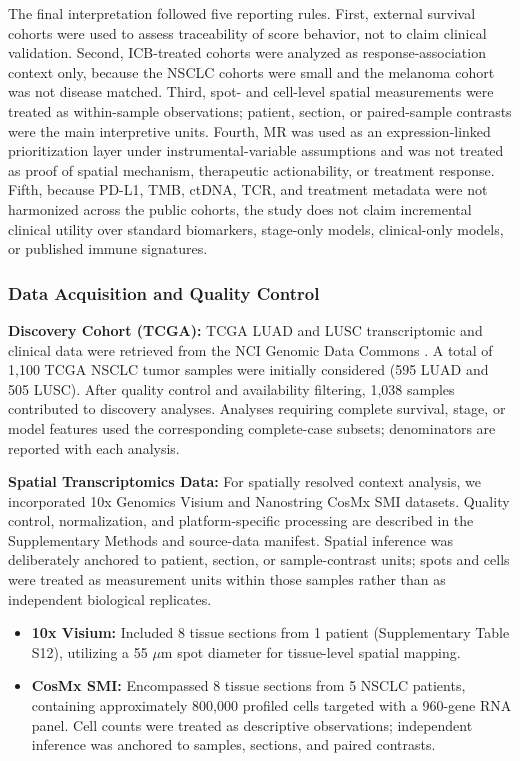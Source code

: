 \documentclass[pdflatex,sn-mathphys-num,referee,lineno]{sn-jnl}
\theoremstyle{thmstyleone}%
\theoremstyle{thmstyletwo}%
\theoremstyle{thmstylethree}%
\begin{document}
The final interpretation followed five reporting rules. First, external survival cohorts were used to assess traceability of score behavior, not to claim clinical validation. Second, ICB-treated cohorts were analyzed as response-association context only, because the NSCLC cohorts were small and the melanoma cohort was not disease matched. Third, spot- and cell-level spatial measurements were treated as within-sample observations; patient, section, or paired-sample contrasts were the main interpretive units. Fourth, MR was used as an expression-linked prioritization layer under instrumental-variable assumptions and was not treated as proof of spatial mechanism, therapeutic actionability, or treatment response. Fifth, because PD-L1, TMB, ctDNA, TCR, and treatment metadata were not harmonized across the public cohorts, the study does not claim incremental clinical utility over standard biomarkers, stage-only models, clinical-only models, or published immune signatures.

\subsubsection{Data Acquisition and Quality Control}

\textbf{Discovery Cohort (TCGA):} TCGA LUAD and LUSC transcriptomic and clinical data were retrieved from the NCI Genomic Data Commons \cite{hoadleyCelloforiginPatternsDominate2018a, thecancergenomeatlasresearchnetworkComprehensiveMolecularProfiling2014a}. A total of 1,100 TCGA NSCLC tumor samples were initially considered (595 LUAD and 505 LUSC). After quality control and availability filtering, 1,038 samples contributed to discovery analyses. Analyses requiring complete survival, stage, or model features used the corresponding complete-case subsets; denominators are reported with each analysis.

\textbf{Spatial Transcriptomics Data:} For spatially resolved context analysis, we incorporated 10x Genomics Visium and Nanostring CosMx SMI datasets. Quality control, normalization, and platform-specific processing are described in the Supplementary Methods and source-data manifest. Spatial inference was deliberately anchored to patient, section, or sample-contrast units; spots and cells were treated as measurement units within those samples rather than as independent biological replicates.
\begin{itemize}
    \item \textbf{10x Visium:} Included 8 tissue sections from 1 patient (Supplementary Table S12), utilizing a 55 $\mu$m spot diameter for tissue-level spatial mapping.
    \item \textbf{CosMx SMI:} Encompassed 8 tissue sections from 5 NSCLC patients, containing approximately 800,000 profiled cells targeted with a 960-gene RNA panel. Cell counts were treated as descriptive observations; independent inference was anchored to samples, sections, and paired contrasts.
\end{itemize}
\end{document}
